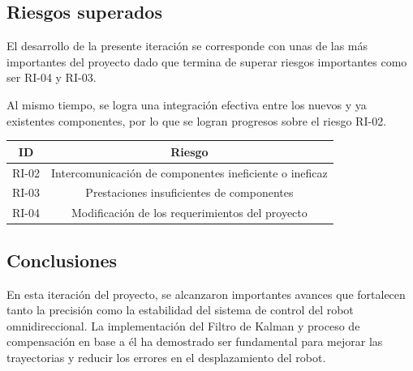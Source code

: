 \subsection{Riesgos superados}
El desarrollo de la presente iteración se corresponde con unas de las más importantes del proyecto dado que termina de superar riesgos importantes como ser RI-04 y RI-03.

Al mismo tiempo, se logra una integración efectiva entre los nuevos y ya existentes componentes, por lo que se logran progresos sobre el riesgo RI-02.

\begin{center} \begin{tabular}{|c|c|} 
    \hline \rowcolor{test_header_color}
        ID & Riesgo \\
    \hline
        RI-02 & Intercomunicación de componentes ineficiente o ineficaz \\
    \hline
        RI-03 & Prestaciones insuficientes de componentes \\
    \hline
        RI-04 & Modificación de los requerimientos del proyecto \\
    \hline
\end{tabular} \end{center}

\subsection{Conclusiones}
En esta iteración del proyecto, se alcanzaron importantes avances que fortalecen tanto la precisión como la estabilidad del sistema de control del robot omnidireccional. La implementación del Filtro de Kalman y proceso de compensación en base a él ha demostrado ser fundamental para mejorar las trayectorias y reducir los errores en el desplazamiento del robot.